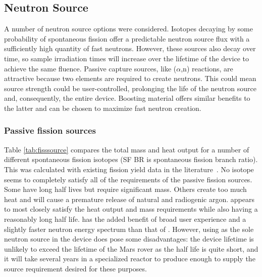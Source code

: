 \documentclass{mc2015}
\begin{document}
\subsection{Neutron Source}

A number of neutron source options were considered. Isotopes decaying by some probability of spontaneous fission offer a predictable neutron source flux with a sufficiently high quantity of fast neutrons. However, these sources also decay over time, so sample irradiation times will increase over the lifetime of the device to achieve the same fluence. Passive capture sources, like ($\alpha$,n) reactions, are attractive because two elements are required to create neutrons. This could mean source strength could be user-controlled, prolonging the life of the neutron source and, consequently, the entire device. Boosting material offers similar benefits to the latter and can be chosen to maximize fast neutron creation.   

\subsubsection{Passive fission sources}

Table \ref{tab:fisssource} compares the total mass and heat output for a number of different spontaneous fission isotopes (SF BR is spontaneous fission branch ratio). This was calculated with existing fission yield data in the literature~\cite{england_evaluation_1995, axton_neutron_1985}.
No isotope seems to completely satisfy all of the requirements of the passive fission sources.
 Some have long half lives but require significant mass. Others create too much heat and will cause a premature release of natural and radiogenic argon.  appears to most closely satisfy the heat output and mass requirements while also having a reasonably long half life.  has the added benefit of broad user experience \cite{martin_production_2000} and a slightly faster neutron energy spectrum than that of  \cite{hjalmar_energy_1955}. However, using  as the sole neutron source in the device does pose some disadvantages: the device lifetime is unlikely to exceed the lifetime of the Mars rover as the half life is quite short, and it will take several years in a specialized reactor to produce enough  to supply the source requirement desired for these purposes. 
\end{document}

